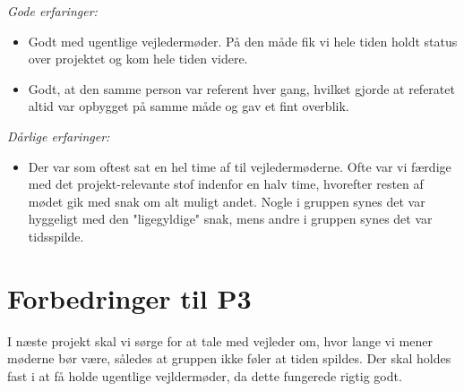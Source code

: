\emph{Gode erfaringer:}
\begin{itemize}

\item Godt med ugentlige vejledermøder. På den måde fik vi hele tiden holdt status over projektet og kom hele tiden videre.

\item Godt, at den samme person var referent hver gang, hvilket gjorde at referatet altid var opbygget på samme måde og gav et fint overblik.
\end{itemize}
\emph{Dårlige erfaringer:}
\begin{itemize}
\item	Der var som oftest sat en hel time af til vejledermøderne. Ofte var vi færdige med det projekt-relevante stof indenfor en halv time, hvorefter resten af mødet gik med snak om alt muligt andet. Nogle i gruppen synes det var hyggeligt med den "ligegyldige" snak, mens andre i gruppen synes det var tidsspilde.

\end{itemize}

\section{Forbedringer til P3}

I næste projekt skal vi sørge for at tale med vejleder om, hvor lange vi mener møderne bør være, således at gruppen ikke føler at tiden spildes. Der skal holdes fast i at få holde ugentlige vejldermøder, da dette fungerede rigtig godt. 
